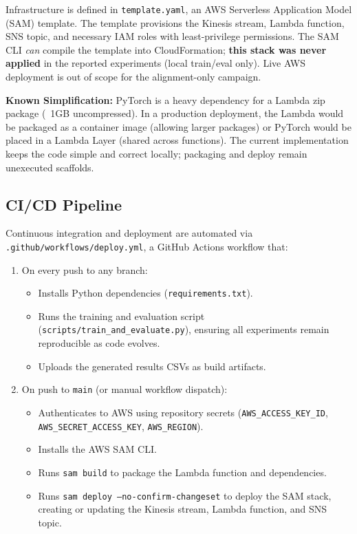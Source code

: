 Infrastructure is defined in \texttt{template.yaml}, an AWS Serverless Application Model (SAM) template. The template provisions the Kinesis stream, Lambda function, SNS topic, and necessary IAM roles with least-privilege permissions. The SAM CLI \emph{can} compile the template into CloudFormation; \textbf{this stack was never applied} in the reported experiments (local train/eval only). Live AWS deployment is out of scope for the alignment-only campaign.

\textbf{Known Simplification:} PyTorch is a heavy dependency for a Lambda zip package (~1GB uncompressed). In a production deployment, the Lambda would be packaged as a container image (allowing larger packages) or PyTorch would be placed in a Lambda Layer (shared across functions). The current implementation keeps the code simple and correct locally; packaging and deploy remain unexecuted scaffolds.

\subsection{CI/CD Pipeline}
\label{subsec:cicd}

Continuous integration and deployment are automated via \texttt{.github/workflows/deploy.yml}, a GitHub Actions workflow that:
\begin{enumerate}
  \item On every push to any branch:
  \begin{itemize}
    \item Installs Python dependencies (\texttt{requirements.txt}).
    \item Runs the training and evaluation script (\texttt{scripts/train\_and\_evaluate.py}), ensuring all experiments remain reproducible as code evolves.
    \item Uploads the generated results CSVs as build artifacts.
  \end{itemize}
  \item On push to \texttt{main} (or manual workflow dispatch):
  \begin{itemize}
    \item Authenticates to AWS using repository secrets (\texttt{AWS\_ACCESS\_KEY\_ID}, \texttt{AWS\_SECRET\_ACCESS\_KEY}, \texttt{AWS\_REGION}).
    \item Installs the AWS SAM CLI.
    \item Runs \texttt{sam build} to package the Lambda function and dependencies.
    \item Runs \texttt{sam deploy --no-confirm-changeset} to deploy the SAM stack, creating or updating the Kinesis stream, Lambda function, and SNS topic.
  \end{itemize}
\end{enumerate}

